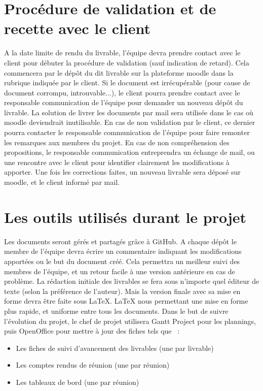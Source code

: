 \section{Procédure de validation et de recette avec le client}
	A la date limite de rendu du livrable, l'équipe devra prendre contact avec le client pour débuter la procédure de validation (sauf indication de retard). Cela commencera par le dépôt du dit livrable sur la plateforme moodle dans la rubrique indiquée par le client.
	Si le document est irrécupérable (pour cause de document corrompu, introuvable...), le client pourra prendre contact avec le responsable communication de l'équipe pour demander un nouveau dépôt du livrable. La solution de livrer les documents par mail sera utilisée dans le cas où moodle deviendrait inutilisable.
	En cas de non validation par le client, ce dernier pourra contacter le responsable communication de l'équipe pour faire remonter les remarques aux membres du projet. En cas de non compréhension des propositions, le responsable communication entreprendra un échange de mail, ou une rencontre avec le client pour identifier clairement les modifications à apporter.
	Une fois les corrections faites, un nouveau livrable sera déposé sur moodle, et le client informé par mail.

\section{Les outils utilisés durant le projet}
	Les documents seront gérés et partagés grâce à GitHub. A chaque dépôt le membre de l'équipe devra écrire un commentaire indiquant les modifications apportées ou le but du document créé. Cela permettra un meilleur suivi des membres de l'équipe, et un retour facile à une version antérieure en cas de problème.
	La rédaction initiale des livrables se fera sous n'importe quel éditeur de texte (selon la préférence de l'auteur). Mais la version finale avec sa mise en forme devra être faite sous LaTeX. LaTeX nous permettant une mise en forme plus rapide, et uniforme entre tous les documents.
Dans le but de suivre l'évolution du projet, le chef de projet utilisera Gantt Project pour les plannings, puis OpenOffice pour mettre à jour des fiches tels que  :
\begin{itemize}
    \item Les fiches de suivi d'avancement des livrables (une par livrable)
    \item Les comptes rendus de réunion (une par réunion)
    \item Les tableaux de bord (une par réunion)
\end{itemize}

